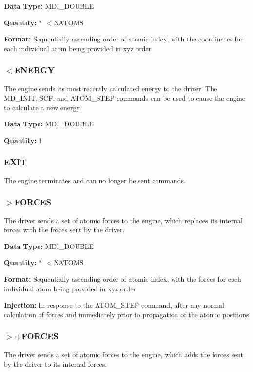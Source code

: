 \begin{DoxyParagraph}{}
{\bfseries  Data Type\-: } M\-D\-I\-\_\-\-D\-O\-U\-B\-L\-E \par
 {\bfseries  Quantity\-: } { $\ast$ $<$N\-A\-T\-O\-M\-S } \par
 {\bfseries  Format\-: } Sequentially ascending order of atomic index, with the coordinates for each individual atom being provided in xyz order
\end{DoxyParagraph}
\hypertarget{index_recv_energy}{}\subsubsection{$<$\-E\-N\-E\-R\-G\-Y}\label{index_recv_energy}
The engine sends its most recently calculated energy to the driver. The {\ttfamily M\-D\-\_\-\-I\-N\-I\-T}, {\ttfamily S\-C\-F}, and {\ttfamily A\-T\-O\-M\-\_\-\-S\-T\-E\-P} commands can be used to cause the engine to calculate a new energy.

\begin{DoxyParagraph}{}
{\bfseries  Data Type\-: } M\-D\-I\-\_\-\-D\-O\-U\-B\-L\-E \par
 {\bfseries  Quantity\-: } 1
\end{DoxyParagraph}
\hypertarget{index_exit_command}{}\subsubsection{E\-X\-I\-T}\label{index_exit_command}
The engine terminates and can no longer be sent commands.\hypertarget{index_send_forces}{}\subsubsection{$>$\-F\-O\-R\-C\-E\-S}\label{index_send_forces}
The driver sends a set of atomic forces to the engine, which replaces its internal forces with the forces sent by the driver.

\begin{DoxyParagraph}{}
{\bfseries  Data Type\-: } M\-D\-I\-\_\-\-D\-O\-U\-B\-L\-E \par
 {\bfseries  Quantity\-: } { $\ast$ $<$N\-A\-T\-O\-M\-S } \par
 {\bfseries  Format\-: } Sequentially ascending order of atomic index, with the forces for each individual atom being provided in xyz order \par
 {\bfseries  Injection\-: } In response to the {\ttfamily A\-T\-O\-M\-\_\-\-S\-T\-E\-P} command, after any normal calculation of forces and immediately prior to propagation of the atomic positions
\end{DoxyParagraph}
\hypertarget{index_send_add_forces}{}\subsubsection{$>$+\-F\-O\-R\-C\-E\-S}\label{index_send_add_forces}
The driver sends a set of atomic forces to the engine, which adds the forces sent by the driver to its internal forces.

